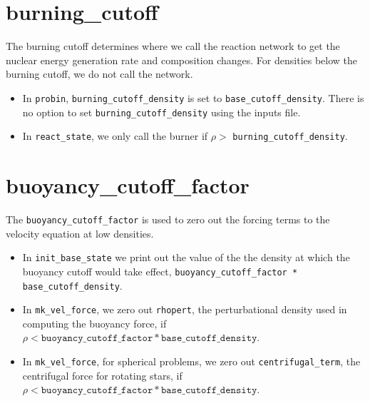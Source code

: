 \section{burning\_cutoff}

The burning cutoff determines where we call the reaction network to
get the nuclear energy generation rate and composition changes.  For
densities below the burning cutoff, we do not call the network.

\begin{itemize}

\item In {\tt probin}, {\tt burning\_cutoff\_density} is set to 
  {\tt base\_cutoff\_density}.  There is no option to set 
  {\tt burning\_cutoff\_density} using the inputs file.

\item In {\tt react\_state}, we only call the burner if 
  $\rho >$ {\tt burning\_cutoff\_density}.


\end{itemize}


\section{buoyancy\_cutoff\_factor}

The {\tt buoyancy\_cutoff\_factor} is used to zero out the forcing terms
to the velocity equation at low densities.

\begin{itemize}

\item In {\tt init\_base\_state} we print out the value of the
   the density at which the buoyancy cutoff would take effect,
   {\tt buoyancy\_cutoff\_factor * base\_cutoff\_density}.

\item In {\tt mk\_vel\_force}, we zero out {\tt rhopert}, the
   perturbational density used in computing the buoyancy force,
   if $\rho < \mathtt{buoyancy\_cutoff\_factor * base\_cutoff\_density}$.

\item In {\tt mk\_vel\_force}, for spherical problems, we 
   zero out {\tt centrifugal\_term}, the centrifugal force for
   rotating stars, if $\rho < \mathtt{buoyancy\_cutoff\_factor *
   base\_cutoff\_density}$.

\end{itemize}





